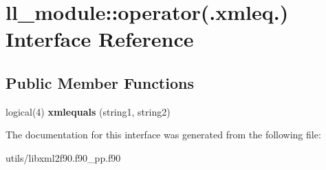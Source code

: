 \hypertarget{interfacell__module_1_1operator_07_8xmleq_8_08}{
\section{ll\_\-module::operator(.xmleq.) Interface Reference}
\label{interfacell__module_1_1operator_07_8xmleq_8_08}
}
\subsection*{Public Member Functions}
\begin{DoxyCompactItemize}
\item 
\hypertarget{interfacell__module_1_1operator_07_8xmleq_8_08_a22b0c6a784f3a5f4260d7fe62309f570}{
logical(4) {\bfseries xmlequals} (string1, string2)}
\label{interfacell__module_1_1operator_07_8xmleq_8_08_a22b0c6a784f3a5f4260d7fe62309f570}

\end{DoxyCompactItemize}


The documentation for this interface was generated from the following file:\begin{DoxyCompactItemize}
\item 
utils/libxml2f90.f90\_\-pp.f90\end{DoxyCompactItemize}

